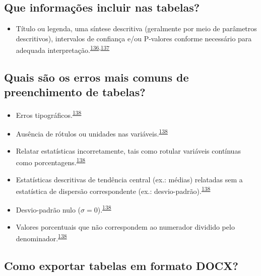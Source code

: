 \documentclass[
  a4paper,
]{book}
\providecommand{\tightlist}{%
  \setlength{\itemsep}{0pt}\setlength{\parskip}{0pt}}
\begin{document}
\hypertarget{que-informauxe7uxf5es-incluir-nas-tabelas}{%
\subsection{Que informações incluir nas tabelas?}\label{que-informauxe7uxf5es-incluir-nas-tabelas}}

\begin{itemize}
\tightlist
\item
  Título ou legenda, uma síntese descritiva (geralmente por meio de parâmetros descritivos), intervalos de confiança e/ou P-valores conforme necessário para adequada interpretação.\textsuperscript{\protect\hyperlink{ref-Inskip2017}{136},\protect\hyperlink{ref-Kwak2021}{137}}
\end{itemize}

\hypertarget{quais-suxe3o-os-erros-mais-comuns-de-preenchimento-de-tabelas}{%
\subsection{Quais são os erros mais comuns de preenchimento de tabelas?}\label{quais-suxe3o-os-erros-mais-comuns-de-preenchimento-de-tabelas}}

\begin{itemize}
\item
  Erros tipográficos.\textsuperscript{\protect\hyperlink{ref-barnett2023}{138}}
\item
  Ausência de rótulos ou unidades nas variáveis.\textsuperscript{\protect\hyperlink{ref-barnett2023}{138}}
\item
  Relatar estatísticas incorretamente, tais como rotular variáveis contínuas como porcentagens.\textsuperscript{\protect\hyperlink{ref-barnett2023}{138}}
\item
  Estatísticas descritivas de tendência central (ex.: médias) relatadas sem a estatística de dispersão correspondente (ex.: desvio-padrão).\textsuperscript{\protect\hyperlink{ref-barnett2023}{138}}
\item
  Desvio-padrão nulo (\(\sigma=0\)).\textsuperscript{\protect\hyperlink{ref-barnett2023}{138}}
\item
  Valores porcentuais que não correspondem ao numerador dividido pelo denominador.\textsuperscript{\protect\hyperlink{ref-barnett2023}{138}}
\end{itemize}

\hypertarget{como-exportar-tabelas-em-formato-docx}{%
\subsection{Como exportar tabelas em formato DOCX?}\label{como-exportar-tabelas-em-formato-docx}}
\end{document}
